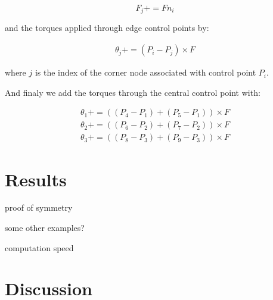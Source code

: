 \documentclass{egpubl}
\begin{document}
\begin{equation}
    F_j += F n_i
\end{equation}

and the torques applied through edge control points by:

\begin{eqnarray}
    \theta_j += (P_i - P_j) \times F
\end{eqnarray}

where $j$ is the index of the corner node associated with control point
$P_i$.

And finaly we add the torques through the central control point with:

\begin{eqnarray}
    \theta_1 += ((P_4 - P_1) + (P_5 - P_1)) \times F \\
    \theta_2 += ((P_6 - P_2) + (P_7 - P_2)) \times F \\
    \theta_3 += ((P_8 - P_3) + (P_9 - P_3)) \times F
\end{eqnarray}



\section{Results}

proof of symmetry

some other examples?

computation speed


\section{Discussion}


%
%
%
%
\end{document}
